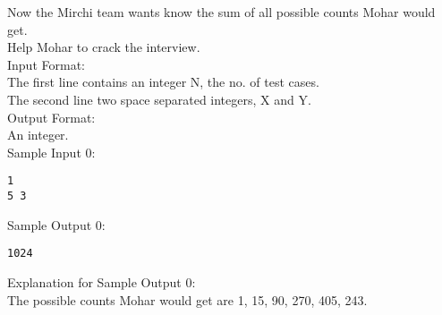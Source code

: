 \documentclass[10pt,a4paper]{article}
\begin{document}
\begin{itemize}
Now the Mirchi team wants know the sum of all possible counts Mohar would get.\\
Help Mohar to crack the interview.\\
Input Format:\\
The first line contains an integer N, the no. of test cases.\\
The second line two space separated integers, X and Y.\\
Output Format:\\
An integer.\\
Sample Input 0:
\begin{verbatim}
1
5 3
\end{verbatim}
Sample Output 0:
\begin{verbatim}
1024
\end{verbatim}
Explanation for Sample Output 0:\\
The possible counts Mohar would get are 1, 15, 90, 270, 405, 243.

\end{itemize}
\end{document}

